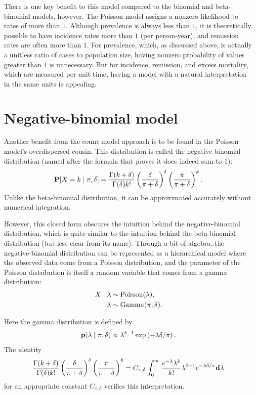 There is one key benefit to this model compared to the binomial and
beta-binomial models, however.  The Poisson model assigns a nonzero
likelihood to rates of more than $1$.  Although prevalence is always
less than $1$, it is theoretically possible to have incidence rates
more than $1$ (per person-year), and remission rates are often more
than $1$.  For prevalence, which, as discussed above, is actually a
unitless ratio of cases to population size, having nonzero probability
of values greater than $1$ is unnecessary.  But for incidence,
remission, and excess mortality, which are measured per unit time,
having a model with a natural interpretation in the same units is
appealing.


\section{Negative-binomial model}
Another benefit from the count model approach is to be found in the
Poisson model's overdispersed cousin.  This distribution is called
the negative-binomial distribution (named after the formula that
proves it does indeed sum to $1$):
\[
\mathbf{P}[X = k\;|\; \pi, \delta] =
 \frac{\Gamma(k+\delta)}{\Gamma(\delta)k!} \left(\frac{\delta}{\pi+\delta}\right)^\delta \left(\frac{\pi}{\pi+\delta}\right)^k.
\]
Unlike the beta-binomial distribution, it can be approximated
accurately without numerical integration.

However, this closed form obscures the intuition behind the
negative-binomial distribution, which is quite similar to the
intuition behind the beta-binomial distribution (but less clear from
its name). Through a bit of algebra, the negative-binomial
distribution can be represented as a hierarchical model where the
observed data come from a Poisson distribution, and the parameter of
the Poisson distribution is itself a random variable that comes from a
gamma distribution:
\begin{align*}
X\;|\; \lambda &\sim \operatorname{Poisson}(\lambda),\\
\lambda &\sim \operatorname{Gamma}(\pi, \delta).
\end{align*}

Here the gamma distribution is defined by
\[
\mathbf{p}(\lambda \;|\; \pi, \delta) \propto \lambda^{\delta-1} \exp\left(-\lambda \delta/\pi \right).
\]
The identity
\[
\frac{\Gamma(k+\delta)}{\Gamma(\delta)k!} \left(\frac{\delta}{\pi+\delta}\right)^\delta \left(\frac{\pi}{\pi+\delta}\right)^k
=
 C_{\pi, \delta} \int_0^\infty \frac{e^{-\lambda}\lambda^k}{k!} \lambda^{\delta-1} e^{-\lambda \delta/\pi} \mathbf{d} \lambda
\]
for an appropriate constant $C_{\pi,\delta}$ verifies this interpretation.

